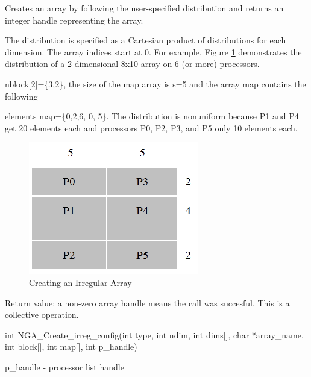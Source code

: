 \documentclass[12pt]{article}
\begin{document}
\begin{desc}

  Creates an array by following the user-specified distribution and
  returns an integer handle representing the array.

  The distribution is specified as a Cartesian product of
  distributions for each dimension. The array indices start at 0. 
For example, Figure \ref{crirreg} demonstrates the distribution of a
2-dimensional 8x10 array on 6 (or more) processors.  

nblock[2]=\{3,2\}, the size of the map array is s=5 and the array map contains the following 

  elements map=\{0,2,6, 0, 5\}. The distribution is nonuniform because
  P1 and P4 get 20 elements each and processors P0, P2, P3, and P5 only
  10 elements each.


\begin{figure}
\includegraphics{CrIrreg}
\centering
\caption{Creating an Irregular Array}
\label{crirreg}
\end{figure}
 
  Return value: a non-zero array handle means the call was succesful.
  This is a collective operation.

\end{desc}



\begin{capi}
\begin{ccode}
int NGA_Create_irreg_config(int type, int ndim, int dims[], 
                            char *array_name, int block[], int map[], 
                            int p_handle)
\end{ccode}
\begin{funcargs}
\end{funcargs}
   p_handle               - processor list handle
\end{capi}
\end{document}
